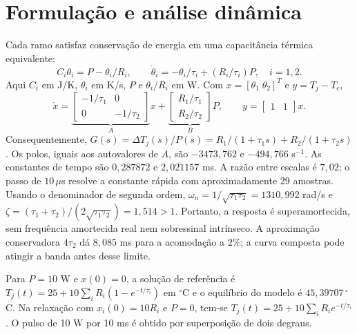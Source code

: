 \documentclass[11pt,a4paper]{article}
\begin{document}
\section{Formulação e análise dinâmica}
Cada ramo satisfaz conservação de energia em uma capacitância térmica
equivalente:
\begin{equation}
 C_i\dot\theta_i=P-\theta_i/R_i,\qquad
 \dot\theta_i=-\theta_i/\tau_i+(R_i/\tau_i)P,\quad i=1,2.
\end{equation}
Aqui $C_i$ em J/K, $\dot\theta_i$ em K/s, $P$ e $\theta_i/R_i$ em W.
Com $x=[\theta_1\;\theta_2]^T$ e $y=T_j-T_c$,
\begin{equation}
 \dot x=\underbrace{\begin{bmatrix}-1/\tau_1&0\\0&-1/\tau_2\end{bmatrix}}_{A}x+
 \underbrace{\begin{bmatrix}R_1/\tau_1\\R_2/\tau_2\end{bmatrix}}_{B}P,
 \qquad y=\begin{bmatrix}1&1\end{bmatrix}x.
\end{equation}
Consequentemente, $G(s)=\Delta T_j(s)/P(s)=R_1/(1+\tau_1s)+
R_2/(1+\tau_2s)$. Os polos, iguais aos autovalores de $A$, são
$-3473{,}762$ e $-494{,}766$ s$^{-1}$. As constantes de tempo são
$0{,}287872$ e $2{,}021157$ ms. A razão entre escalas é $7{,}02$;
o passo de $10\,\mu$s resolve a constante rápida com aproximadamente
29 amostras. Usando o denominador de segunda ordem,
$\omega_n=1/\sqrt{\tau_1\tau_2}=1310{,}992$ rad/s e
$\zeta=(\tau_1+\tau_2)/(2\sqrt{\tau_1\tau_2})=1{,}514>1$.
Portanto, a resposta é superamortecida, sem frequência amortecida real
nem sobressinal intrínseco. A aproximação conservadora $4\tau_2$ dá
$8{,}085$ ms para a acomodação a $2\%$; a curva composta pode atingir a
banda antes desse limite.

Para $P=10$ W e $x(0)=0$, a solução de referência é
$T_j(t)=25+10\sum_iR_i(1-e^{-t/\tau_i})$ em $^\circ$C e o equilíbrio
do modelo é $45{,}39707\,^\circ$C. Na relaxação com
$x_i(0)=10R_i$ e $P=0$, tem-se
$T_j(t)=25+10\sum_iR_i e^{-t/\tau_i}$.
O pulso de 10 W por 10 ms é obtido por superposição de dois degraus.
\end{document}
